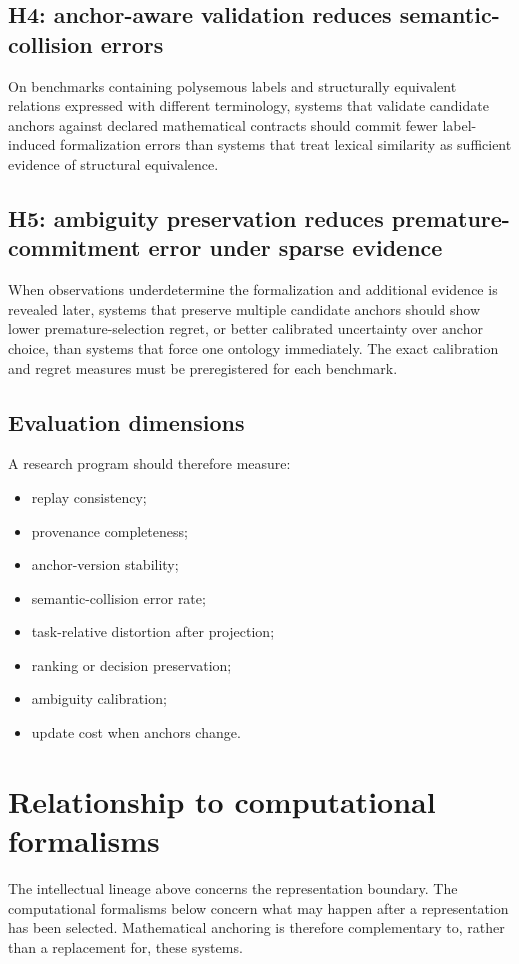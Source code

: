 \documentclass[11pt,a4paper]{article}
\begin{document}
\subsection{H4: anchor-aware validation reduces semantic-collision errors}
On benchmarks containing polysemous labels and structurally equivalent relations expressed with different terminology, systems that validate candidate anchors against declared mathematical contracts should commit fewer label-induced formalization errors than systems that treat lexical similarity as sufficient evidence of structural equivalence.

\subsection{H5: ambiguity preservation reduces premature-commitment error under sparse evidence}
When observations underdetermine the formalization and additional evidence is revealed later, systems that preserve multiple candidate anchors should show lower premature-selection regret, or better calibrated uncertainty over anchor choice, than systems that force one ontology immediately. The exact calibration and regret measures must be preregistered for each benchmark.

\subsection{Evaluation dimensions}
A research program should therefore measure:
\begin{itemize}
    \item replay consistency;
    \item provenance completeness;
    \item anchor-version stability;
    \item semantic-collision error rate;
    \item task-relative distortion after projection;
    \item ranking or decision preservation;
    \item ambiguity calibration;
    \item update cost when anchors change.
\end{itemize}

\section{Relationship to computational formalisms}
The intellectual lineage above concerns the representation boundary. The computational formalisms below concern what may happen after a representation has been selected. Mathematical anchoring is therefore complementary to, rather than a replacement for, these systems.
\end{document}
